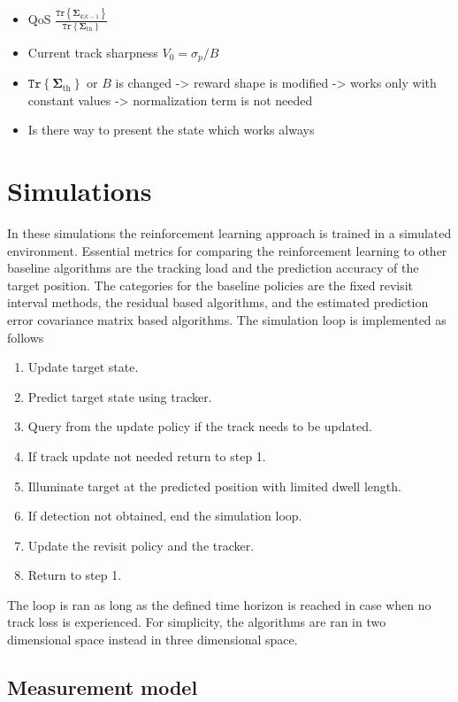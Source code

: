 \documentclass[english, 12pt, a4paper, elec, utf8, a-1b, online]{aaltothesis}
\newcommand{\tr}[1]{\texttt{Tr}\left\{ #1 \right\}}
\newcommand{\priorecov}{\boldsymbol{\Sigma}_{k|k-1}}
\newcommand{\priorecovth}{\bm{\Sigma}_{\text{th}}}
\begin{document}
\begin{itemize}
    \item QoS $\frac{\tr{\priorecov}}{\tr{\priorecovth}}$
    \item Current track sharpness $V_0 = \sigma_p/B$
    \item $\tr{\priorecovth}$ or $B$ is changed -> reward shape is modified -> works only with constant values -> normalization term is not needed
    \item Is there way to present the state which works always 
\end{itemize}

\newpage
\section{Simulations}


In these simulations the reinforcement learning approach is trained in a simulated environment.
Essential metrics for comparing the reinforcement learning to other baseline algorithms are the tracking load and the prediction accuracy of the target position.
The categories for the baseline policies are the fixed revisit interval methods, the residual based algorithms, and the estimated prediction error covariance matrix based algorithms.
The simulation loop is implemented as follows
\begin{enumerate}
    \item Update target state.
    \item Predict target state using tracker.
    \item Query from the update policy if the track needs to be updated.
    \item If track update not needed return to step 1.
    \item Illuminate target at the predicted position with limited dwell length.
    \item If detection not obtained, end the simulation loop.
    \item Update the revisit policy and the tracker.
    \item Return to step 1.
\end{enumerate}
The loop is ran as long as the defined time horizon is reached in case when no track loss is experienced.
For simplicity, the algorithms are ran in two dimensional space instead in three dimensional space.

\subsection{Measurement model}
\end{document}
